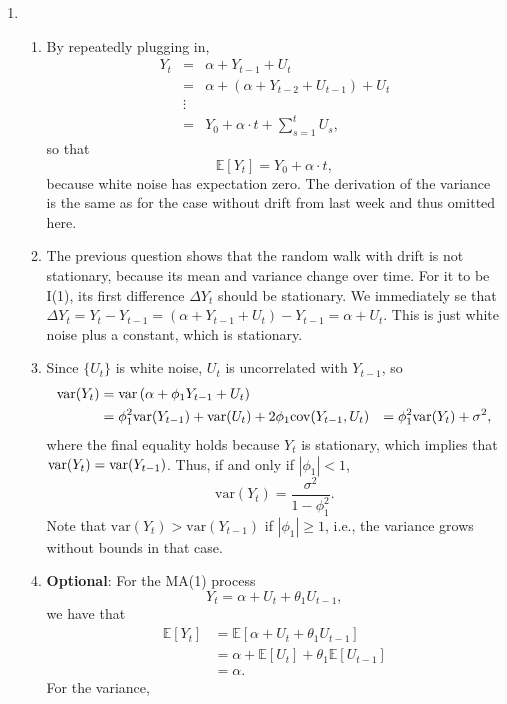 \documentclass[11pt, a4paper]{article}
\newcommand{\E}{\ensuremath{{\mathbb E}}} %
\def\func#1{\mathop{\rm #1}}
\begin{document}
\begin{enumerate}
\item
\begin{enumerate}
\item By repeatedly plugging in,
\begin{eqnarray*}
Y_t&=&\alpha+Y_{t-1}+U_t\\
   &=&\alpha+(\alpha +Y_{t-2}+U_{t-1})+U_t\\
  &\vdots&\\
&=&Y_0+\alpha\cdot t+\sum_{s=1}^t U_s,
\end{eqnarray*}
so that
\[
\E[Y_t]=Y_0+ \alpha\cdot t,
\]
because white noise has expectation zero. The derivation of the variance is the same as for the case without drift from last week and thus omitted here.
\item The previous question shows that the random walk with drift is not stationary, because its mean and variance change over time. For it to be I(1), its first difference $\Delta Y_t$ should be stationary.
We immediately se that $\Delta Y_t=Y_t-Y_{t-1}=(\alpha+Y_{t-1}+U_t)-Y_{t-1}=\alpha + U_t$. This is just white noise plus a constant, which is stationary.
\item
Since $\{U_t\}$ is white noise, $U_t$  is uncorrelated with $Y_{t-1}$, so
\begin{align*}
\mathrm{var}(Y_t) &= \func{var}\left(\alpha+\phi_1Y_{t-1}+U_{t}\right)\\
&= \phi_1^2 \mathrm{var}(Y_{t-1}) + \mathrm{var}(U_t) + 2
\phi_1 \mathrm{cov}(Y_{t-1},U_{t})
&= \phi_1^2 \mathrm{var}(Y_{t}) +
\sigma^2,
\end{align*}
where the final equality holds because $Y_t$ is stationary, which implies that $\func{var}(Y_t)=\func{var}(Y_{t-1})$. Thus, if and only if $|\phi_1 |<1$,
\begin{equation*}
\mathrm{var}(Y_t) = \frac{\sigma^2}{1-\phi_1^2}.
\end{equation*}
Note that $\mathrm{var}(Y_t) > \mathrm{var}(Y_{t-1})$ if $|\phi_1 |\ge 1$, i.e., the variance grows without bounds in that case.
\item \textbf{Optional}: For the MA(1) process
\begin{equation*}
Y_t=\alpha + U_t + \theta_1 U_{t-1},
\end{equation*}
we have that
\begin{align*}
\E[Y_t]&=\E[\alpha + U_t + \theta_1 U_{t-1}]\\
&=\alpha + \E[U_t] + \theta_1 \E[U_{t-1}]\\
&=\alpha.
\end{align*}
For the variance,

\end{enumerate}
\end{enumerate}
\end{document}
